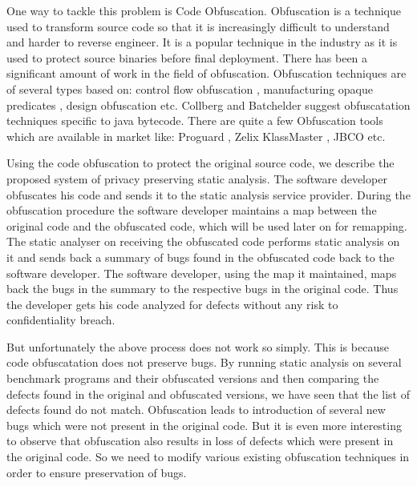 \documentclass[twocolumn]{article}
\begin{document}
One way to tackle this problem is Code Obfuscation. Obfuscation is a technique used to transform source code so that it is increasingly difficult to understand 
and harder to reverse engineer. It is a popular technique in the industry as it is used to protect source binaries before final deployment. There has been a significant amount of work
in the field of obfuscation. Obfuscation techniques are of several types based on: control flow obfuscation \cite{controlflowobf}, manufacturing opaque predicates \cite{collberg}, 
design obfuscation \cite{designobf} etc. Collberg \cite{collberg} and Batchelder \cite{jbco} suggest obfuscatation techniques specific to java bytecode. There are quite a few 
Obfuscation tools which are available in market like: Proguard \cite{proguard}, Zelix KlassMaster \cite{zelix}, JBCO \cite{jbco}etc.

Using the code obfuscation to protect the original source code, we describe the proposed system of privacy preserving static analysis. The software developer obfuscates his code 
and sends it to the static analysis service provider. During the obfuscation procedure the software developer maintains a map between the original code and the obfuscated code, 
which will be used later on for remapping. The static analyser on receiving the obfuscated code performs static analysis on it and sends back a summary of bugs found in the obfuscated 
code back to the software developer. The software developer, using the map it maintained, maps back the bugs in the summary to the respective bugs in the original code. Thus the 
developer gets his code analyzed for defects without any risk to confidentiality breach.

But unfortunately the above process does not work so simply. This is because code obfuscatation does not preserve bugs. By running static analysis on several benchmark programs and 
their obfuscated versions and then comparing the defects found in the original and obfuscated versions, we have seen that the list of defects found do not match. Obfuscation leads to 
introduction of several new bugs which were not present in the original code. But it is even more interesting to observe that obfuscation also results in loss of defects which were 
present in the original code. So we need to modify various existing obfuscation techniques in order to ensure preservation of bugs.
\end{document}
